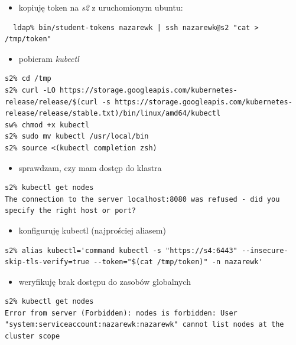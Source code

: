 \documentclass[a4paper,12pt,twoside,openany]{report}
\providecommand{\tightlist}{%
  \setlength{\itemsep}{0pt}\setlength{\parskip}{0pt}}
\begin{document}
\begin{itemize}
\tightlist
\item
  kopiuję token na \emph{s2} z uruchomionym ubuntu:
\end{itemize}

\begin{lstlisting}
  ldap% bin/student-tokens nazarewk | ssh nazarewk@s2 "cat > /tmp/token"
\end{lstlisting}

\begin{itemize}
\tightlist
\item
  pobieram \emph{kubectl}
\end{itemize}

\begin{lstlisting}
s2% cd /tmp
s2% curl -LO https://storage.googleapis.com/kubernetes-release/release/$(curl -s https://storage.googleapis.com/kubernetes-release/release/stable.txt)/bin/linux/amd64/kubectl
sw% chmod +x kubectl
s2% sudo mv kubectl /usr/local/bin
s2% source <(kubectl completion zsh)
\end{lstlisting}

\begin{itemize}
\tightlist
\item
  sprawdzam, czy mam dostęp do klastra
\end{itemize}

\begin{lstlisting}
s2% kubectl get nodes
The connection to the server localhost:8080 was refused - did you specify the right host or port?
\end{lstlisting}

\begin{itemize}
\tightlist
\item
  konfiguruję kubectl (najprościej aliasem)
\end{itemize}

\begin{lstlisting}
s2% alias kubectl='command kubectl -s "https://s4:6443" --insecure-skip-tls-verify=true --token="$(cat /tmp/token)" -n nazarewk'
\end{lstlisting}

\begin{itemize}
\tightlist
\item
  weryfikuję brak dostępu do zasobów globalnych
\end{itemize}

\begin{lstlisting}
s2% kubectl get nodes
Error from server (Forbidden): nodes is forbidden: User "system:serviceaccount:nazarewk:nazarewk" cannot list nodes at the cluster scope
\end{lstlisting}
\end{document}
